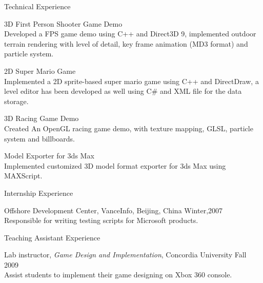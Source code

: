 \documentclass[10pt]{article}
\newenvironment{mydescription}{%
    \begin{description}
        \setlength{\itemsep}{0.25em}%
        \setlength{\parsep}{0em}%
        \setlength{\topsep}{\itemsep}%
        \setlength{\parskip}{0em}%
        \setlength{\labelwidth}{0.1em}
        \setlength{\labelsep}{0em} 
    }%
{\end{description}}
\begin{document}
\begin{cv}
\begin{cvlist}{Technical Experience}
\begin{mydescription}
        \item[3D First Person Shooter Game Demo] \hfill \\ 
            Developed a FPS game demo using C++ and Direct3D 9, implemented outdoor terrain rendering with level of detail, key frame animation (MD3 format) and particle system.
            
        \item[2D Super Mario Game] \hfill \\
            Implemented a 2D sprite-based super mario game using C++ and DirectDraw, a level editor has been developed as well using C\# and XML file for the data storage.
       
        \item[3D Racing Game Demo] \hfill \\ 
            Created An OpenGL racing game demo, with texture mapping, GLSL, particle system and billboards.
            
            
        \item[Model Exporter for 3ds Max] \hfill \\
            Implemented customized 3D model format exporter for 3ds Max using MAXScript. 
    \end{mydescription}
\end{cvlist}

\begin{cvlist}{Internship Experience}
\item 
    \begin{mydescription}
        \item[Offshore Development Center, VanceInfo, Beijing, China] \hfill Winter,2007 \\ 
            Responsible for writing testing scripts for Microsoft products. 
    \end{mydescription}
\end{cvlist}

\begin{cvlist}{Teaching Assistant Experience}
\item
    \begin{mydescription}
        \item[Lab instructor, \emph{Game Design and Implementation}, Concordia University] \hfill Fall 2009\\
            Assist students to implement their game designing on Xbox 360 console. 


\end{mydescription}
\end{cvlist}
\end{cv}
\end{document}
